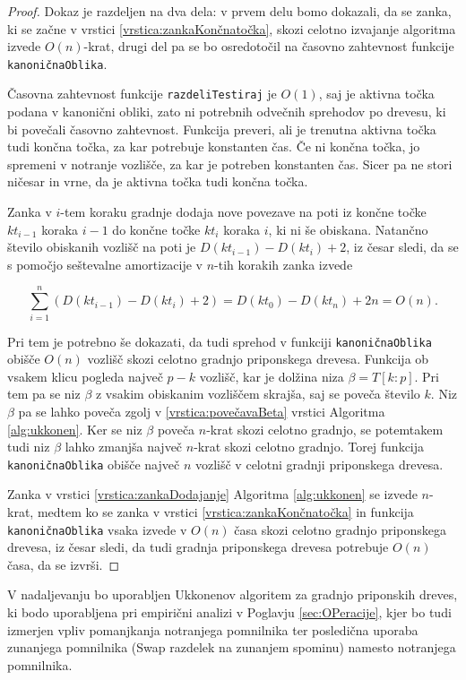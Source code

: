 \begin{proof}

Dokaz je razdeljen na dva dela: v prvem delu bomo dokazali, da se zanka, ki se začne v vrstici \ref{vrstica:zankaKončnatočka}, skozi celotno izvajanje algoritma izvede $O(n)$-krat, drugi del pa se bo osredotočil na časovno zahtevnost funkcije \texttt{kanoničnaOblika}. 

Časovna zahtevnost funkcije \texttt{razdeliTestiraj} je $O(1)$, saj je aktivna točka podana v kanonični obliki, zato ni potrebnih odvečnih sprehodov po drevesu, ki bi povečali časovno zahtevnost. Funkcija preveri, ali je trenutna aktivna točka tudi končna točka, za kar potrebuje konstanten čas. Če ni končna točka, jo spremeni v notranje vozlišče, za kar je potreben konstanten čas. Sicer pa ne stori ničesar in vrne, da je aktivna točka tudi končna točka.

Zanka v $i$-tem koraku gradnje dodaja nove povezave na poti iz končne točke $kt_{i-1}$ koraka $i-1$ do končne točke $kt_i$ koraka $i$, ki ni še obiskana. Natančno število obiskanih vozlišč na poti je $D(kt_{i-1})-D(kt_i)+2$, iz česar sledi, da se s pomočjo seštevalne amortizacije v $n$-tih korakih zanka izvede


$$
    \sum_{i=1}^n \left(D(kt_{i-1})-D(kt_i)+2\right)=D(kt_0)-D(kt_n)+2n=O(n).
$$

Pri tem je potrebno še dokazati, da tudi sprehod v funkciji \texttt{kanoničnaOblika} obišče $O(n)$ vozlišč skozi celotno gradnjo priponskega drevesa. Funkcija ob vsakem klicu pogleda največ $p-k$ vozlišč, kar je dolžina niza $\beta=T[k:p]$. Pri tem pa se niz $\beta$ z vsakim obiskanim vozliščem skrajša, saj se poveča število $k$. Niz $\beta$ pa se lahko poveča zgolj v \ref{vrstica:povečavaBeta} vrstici Algoritma \ref{alg:ukkonen}. Ker se niz $\beta$ poveča $n$-krat skozi celotno gradnjo, se potemtakem tudi niz $\beta$ lahko zmanjša največ $n$-krat skozi celotno gradnjo. Torej funkcija \texttt{kanoničnaOblika} obišče največ $n$ vozlišč v celotni gradnji priponskega drevesa.


Zanka v vrstici \ref{vrstica:zankaDodajanje} Algoritma \ref{alg:ukkonen} se izvede $n$-krat, medtem ko se zanka v vrstici \ref{vrstica:zankaKončnatočka} in funkcija \texttt{kanoničnaOblika} vsaka izvede v $O(n)$ časa skozi celotno gradnjo priponskega drevesa, iz česar sledi, da tudi gradnja priponskega drevesa potrebuje $O(n)$ časa, da se izvrši.
  
\end{proof}


V nadaljevanju bo uporabljen Ukkonenov algoritem za gradnjo priponskih dreves, ki bodo uporabljena pri empirični analizi v Poglavju \ref{sec:OPeracije}, kjer bo tudi izmerjen vpliv pomanjkanja notranjega pomnilnika ter posledična uporaba zunanjega pomnilnika (Swap razdelek na zunanjem spominu) namesto notranjega pomnilnika.